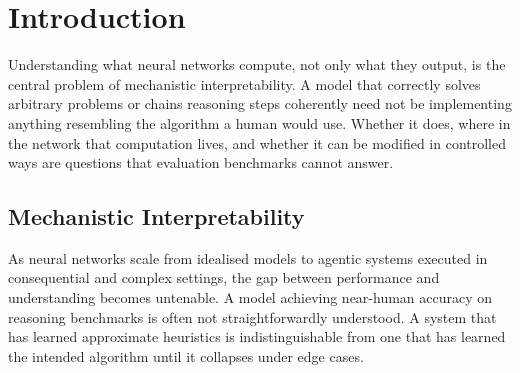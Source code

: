 \chapter{Introduction}
\label{sec:introduction}


Understanding what neural networks compute, not only what they output,
is the central problem of mechanistic interpretability. A model that correctly solves arbitrary problems or chains
reasoning steps coherently need not be implementing anything resembling the algorithm a human would use.
Whether it does, where in the network that computation lives, and whether it can be modified in controlled ways
are questions that evaluation benchmarks cannot answer.

\section{Mechanistic Interpretability}

As neural networks scale from idealised models to agentic systems executed in consequential and complex settings,
the gap between performance and understanding becomes untenable. A model achieving near-human accuracy on reasoning benchmarks
is often not straightforwardly understood. A system that has learned approximate heuristics is indistinguishable from one that has learned the intended
algorithm until it collapses under edge cases. 


